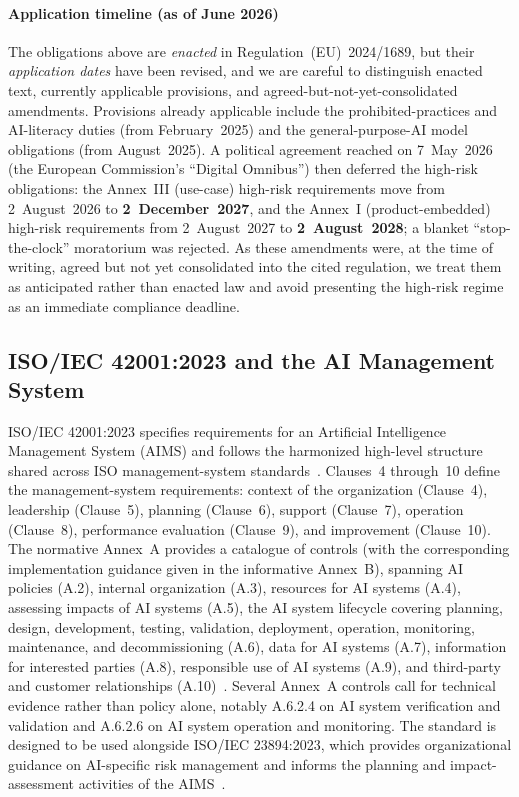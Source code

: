 \paragraph{Application timeline (as of June 2026)} The obligations above are \emph{enacted} in
Regulation~(EU)~2024/1689, but their \emph{application dates} have been revised, and we are
careful to distinguish enacted text, currently applicable provisions, and agreed-but-not-yet-consolidated
amendments. Provisions already applicable include the prohibited-practices and AI-literacy duties
(from February~2025) and the general-purpose-AI model obligations (from August~2025). A political
agreement reached on 7~May~2026 (the European Commission's ``Digital Omnibus'') then deferred the
high-risk obligations: the Annex~III (use-case) high-risk requirements move from 2~August~2026 to
\textbf{2~December~2027}, and the Annex~I (product-embedded) high-risk requirements from
2~August~2027 to \textbf{2~August~2028}; a blanket ``stop-the-clock'' moratorium was rejected. As
these amendments were, at the time of writing, agreed but not yet consolidated into the cited
regulation, we treat them as anticipated rather than enacted law and avoid presenting the high-risk
regime as an immediate compliance deadline.

\subsection{ISO/IEC 42001:2023 and the AI Management System}
\label{subsec:iso}
ISO/IEC 42001:2023 specifies requirements for an Artificial Intelligence Management System (AIMS) and follows the harmonized high-level structure shared across ISO management-system standards~\cite{iso42001}. Clauses~4 through~10 define the management-system requirements: context of the organization (Clause~4), leadership (Clause~5), planning (Clause~6), support (Clause~7), operation (Clause~8), performance evaluation (Clause~9), and improvement (Clause~10). The normative Annex~A provides a catalogue of controls (with the corresponding implementation guidance given in the informative Annex~B), spanning AI policies (A.2), internal organization (A.3), resources for AI systems (A.4), assessing impacts of AI systems (A.5), the AI system lifecycle covering planning, design, development, testing, validation, deployment, operation, monitoring, maintenance, and decommissioning (A.6), data for AI systems (A.7), information for interested parties (A.8), responsible use of AI systems (A.9), and third-party and customer relationships (A.10)~\cite{iso42001}. Several Annex~A controls call for technical evidence rather than policy alone, notably A.6.2.4 on AI system verification and validation and A.6.2.6 on AI system operation and monitoring. The standard is designed to be used alongside ISO/IEC 23894:2023, which provides organizational guidance on AI-specific risk management and informs the planning and impact-assessment activities of the AIMS~\cite{iso23894}.

